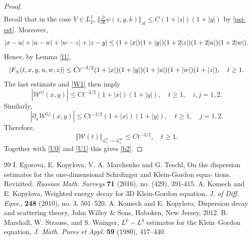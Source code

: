\documentclass[10pt,a4paper]{amsart}
\newcommand{\cL}{{\mathcal L}}
\begin{document}
\begin{proof}
\begin{eqnarray}
\end{eqnarray}
Recall that in the case $V\in L^1_2$,
$\Vert \frac{\partial}{\partial k}\psi(z,y,k)\Vert_{\mathcal A}\le C(1+|z|)(1+|y|)$  by \eqref{psi-est}. 
Moreover,
\[
|x-u|+|u-{\rm w}|+|{\rm w}-z|+|z-y|\le (1+|x|)(1+|y|)(1+2|z|) (1+2|u|)(1+2|{\rm w}|).
\] 
Hence, by Lemma \ref{l1}, 
\[
|F_{\pm}(t,x,y,u,{\rm w},z) |\le Ct^{-3/2} (1+|x|)(1+|y|)(1+|u|)(1+|{\rm w}|)(1+|z|),\quad t\ge 1.
\]
The last estimate and \eqref{W1}  then imply
\[
|{\mathcal W}^{ij}(x,y)|\le  Ct^{-3/2} (1+|x|)(1+|y|),\quad t\ge 1,\quad i,j=1,2.
\] 
Similarly,
\[
|\partial_x {\mathcal W}^{1j}(x,y)|\le  Ct^{-3/2} (1+|x|)(1+|y|),\quad t\ge 1,\quad j=1,2.
\]
Therefore,
\[
\Vert {\mathcal W}(t)\Vert_{\cL^1_1\to\cL^\infty_1}\le  Ct^{-3/2}, \quad t\ge 1.
\]
Together with  \eqref{U0} and \eqref{U1} this gives \eqref{b2}.
\end{proof}

\begin{thebibliography}{99}
 I. Egorova, E. Kopylova, V. A. Marchenko and G. Teschl, On the dispersion estimates for the one-dimensional Schrdinger and Klein-Gordon equa- tions. Revizited. {\em Russian Math. Surveys} {\bf 71} (2016), no. (429), 391-415.
 A. Komech and E. Kopylova, Weighted energy decay for 3D Klein-Gordon equation, {\em J. of Diff. Eqns.}, {\bf 248} (2010), no. 3, 501--520.
 A. Komech and E. Kopylova, Dispersion decay and scattering theory, John Willey \& Sons, Hoboken, New Jersey, 2012.
 B. Marshall, W. Strauss, and S. Wainger, $L^p-L^q$ estimates for the Klein--Gordon equation, {\em J. Math. Pures et Appl.} {\bf 59} (1980), 417--440.
\end{thebibliography}
\end{document}
